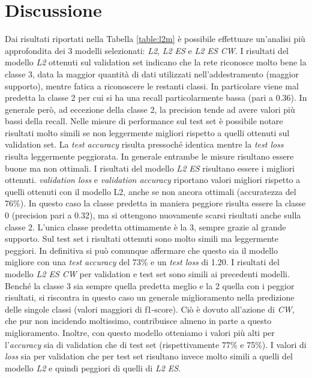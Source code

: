 \section{Discussione}

Dai risultati riportati nella Tabella \ref{table:l2m} è possibile effettuare un'analisi più approfondita dei 3 modelli selezionati: \textit{L2}, \textit{L2 ES} e \textit{L2 ES CW}.
I risultati del modello \textit{L2} ottenuti sul validation set indicano che la rete riconosce molto bene la classe 3, data la maggior quantità di dati utilizzati nell'addestramento (maggior supporto), mentre fatica a riconoscere le restanti classi. 
In particolare viene mal predetta la classe 2 per cui si ha una recall particolarmente bassa (pari a 0.36). 
In generale però, ad eccezione della classe 2, la precision tende ad avere valori più bassi della recall. 
Nelle misure di performance sul test set è possibile notare risultati molto simili se non leggermente migliori rispetto a quelli ottenuti sul validation set.
La \textit{test accuracy} risulta pressoché identica mentre la \textit{test loss} risulta leggermente peggiorata. 
In generale entrambe le misure risultano essere buone ma non ottimali.
I risultati del modello \textit{L2 ES} risultano essere i migliori ottenuti.
\textit{validation loss} e \textit{validation accuracy} riportano valori migliori rispetto a quelli ottenuti con il modello L2, anche se non ancora ottimali (accuratezza del 76\%). 
In questo caso la classe predetta in maniera peggiore risulta essere la classe 0 (precision pari a 0.32), ma si ottengono nuovamente scarsi risultati anche sulla classe 2. L'unica classe predetta ottimamente è la 3, sempre grazie al grande supporto.
Sul test set i risultati ottenuti sono molto simili ma leggermente peggiori. In definitiva si può comunque affermare che questo sia il modello migliore con una \textit{test accuracy} del 73\% e un \textit{test loss} di 1.20. 
I risultati del modello \textit{L2 ES CW} per validation e test set sono simili ai precedenti modelli. Benché la classe 3 sia sempre quella predetta meglio e la 2 quella con i peggior risultati, si riscontra in questo caso un generale miglioramento nella predizione delle singole classi (valori maggiori di f1-score). Ciò è dovuto all'azione di \textit{CW}, che pur non incidendo moltissimo, contribuisce almeno in parte a questo miglioramento.
Inoltre, con questo modello otteniamo i valori più alti per l'\textit{accuracy} sia di validation che di test set (rispettivamente 77\% e 75\%).
I valori di \textit{loss} sia per validation che per test set risultano invece molto simili a quelli del modello \textit{L2} e quindi peggiori di quelli di \textit{L2 ES}.
